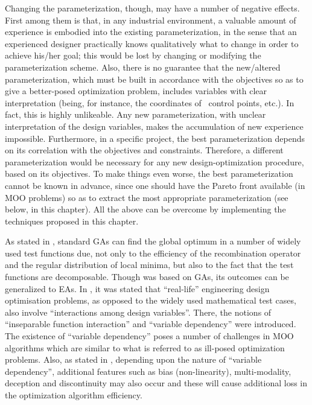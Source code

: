 Changing the parameterization, though, may have a number of negative effects. First among them is that, in any industrial environment, a valuable amount of experience is embodied into the existing parameterization, in the sense that an experienced designer practically knows qualitatively what to change in order to achieve his/her goal; this would be lost by changing or modifying the parameterization scheme. Also, there is no guarantee that the new/altered parameterization, which must be built in accordance with the objectives so as to give a better-posed optimization problem, includes variables with clear interpretation (being, for instance, the coordinates of \Bezier\ control points, etc.). In fact, this is highly unlikeable. Any new parameterization, with unclear interpretation of the design variables, makes the accumulation of new experience impossible. Furthermore, in a specific project, the best parameterization depends on its correlation with the objectives and constraints. Therefore, a different parameterization would be necessary for any new design-optimization procedure, based on its objectives. To make things even worse, the best parameterization cannot be known in advance, since one should have the Pareto front available (in MOO problems) so as to extract the most appropriate parameterization (see below, in this chapter). All the above can be overcome by implementing the techniques proposed in this chapter.                 


As stated in \cite{Salomon}, standard GAs can find the global optimum in a number of widely used test functions due, not only to the efficiency of the recombination operator and the regular distribution of local minima, but also to the fact that the test functions are decomposable. Though \citep{Salomon} was based on GAs, its outcomes can be generalized to EAs. In \cite{Roy_2002a,Roy_2002b},  it was stated that ``real-life'' engineering design optimisation problems, as opposed to the widely used mathematical test cases, also involve ``interactions among design variables''. There, the notions of ``inseparable function interaction'' and ``variable dependency'' were introduced. The existence  of ``variable dependency'' poses a number of challenges in MOO algorithms which are similar to what is referred to as ill-posed optimization problems.
Also, as stated in \cite{Roy_2002b}, depending upon the nature of ``variable dependency'', additional features such as bias (non-linearity), multi-modality, deception and discontinuity may also occur and these will cause additional loss in the optimization algorithm efficiency. 


